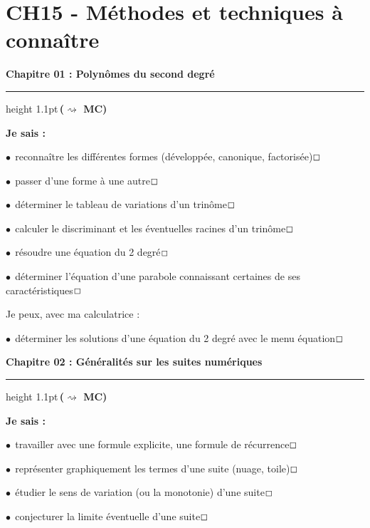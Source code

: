 \documentclass[a4paper,11pt]{article}
\author{Pierquet}
\title{\nomfichier}
\begin{document}
\newcommand\titrexo[1]{\textbf{\textcolor{titrebleu}{\Large\sffamily #1}}}

\pagestyle{fancy}

\part{CH15 - Méthodes et techniques à connaître}

\medskip

\makeatletter
	\def\hrulefill{\leavevmode\leaders\hrule height 1.1pt\hfill\kern\z@}%
\makeatother

\titrexo{Chapitre 01 : Polynômes du second degré}\color{titrebleu}\,\hrulefill\,\titrexo{($\rightsquigarrow$ MC)}

\begin{casavoir}
\selectfont\small
\textbf{Je sais :}

\tabula{}$\bullet~~$reconnaître les différentes formes (développée, canonique, factorisée)\dotfill{}$\Large\Box$

\tabula{}$\bullet~~$passer d'une forme à une autre\dotfill{}$\Large\Box$

\tabula{}$\bullet~~$déterminer le tableau de variations d'un trinôme\dotfill{}$\Large\Box$

\tabula{}$\bullet~~$calculer le discriminant et les éventuelles racines d'un trinôme\dotfill{}$\Large\Box$

\tabula{}$\bullet~~$résoudre une équation du 2 degré\dotfill{}$\Large\Box$

\tabula{}$\bullet~~$déterminer l'équation d'une parabole connaissant certaines de ses caractéristiques\dotfill{}$\Large\Box$
\end{casavoir}

\begin{ccalco}
\selectfont\small
Je peux, avec ma calculatrice :

\tabula{}$\bullet~~$déterminer les solutions d'une équation du 2 degré avec le menu équation\dotfill{}$\Large\Box$
\end{ccalco}

\titrexo{Chapitre 02 : Généralités sur les suites numériques}\color{titrebleu}\,\hrulefill\,\titrexo{($\rightsquigarrow$ MC)}

\begin{casavoir}
\selectfont\small
\textbf{Je sais :}

\tabula{}$\bullet~~$travailler avec une formule explicite, une formule de récurrence\dotfill{}$\Large\Box$

\tabula{}$\bullet~~$représenter graphiquement les termes d'une suite (nuage, toile)\dotfill{}$\Large\Box$

\tabula{}$\bullet~~$étudier le sens de variation (ou la monotonie) d'une suite\dotfill{}$\Large\Box$

\tabula{}$\bullet~~$conjecturer la limite éventuelle d'une suite\dotfill{}$\Large\Box$
\end{casavoir}
\end{document}
